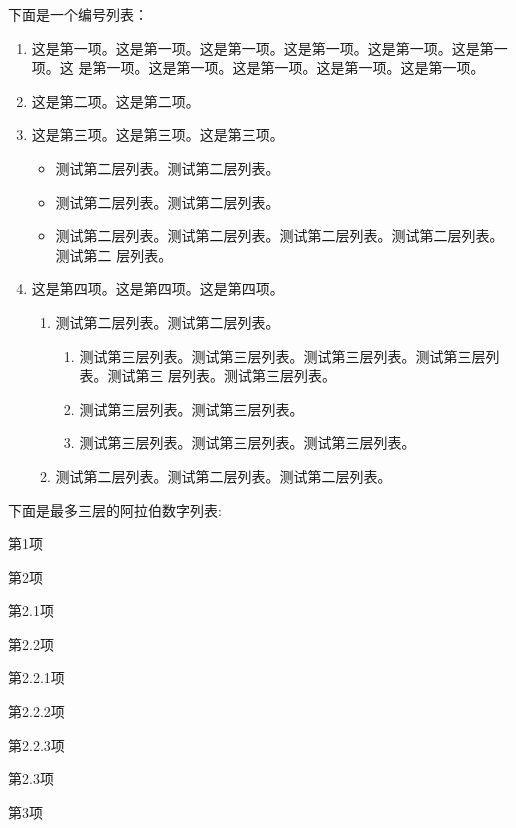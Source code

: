 \documentclass[phd,nobackinfo]{scutthesis}
\begin{document}
下面是一个编号列表：

\begin{enumerate}
\item 这是第一项。这是第一项。这是第一项。这是第一项。这是第一项。这是第一项。这
  是第一项。这是第一项。这是第一项。这是第一项。这是第一项。
\item 这是第二项。这是第二项。
\item 这是第三项。这是第三项。这是第三项。
  \begin{itemize}
  \item 测试第二层列表。测试第二层列表。
  \item 测试第二层列表。测试第二层列表。
  \item 测试第二层列表。测试第二层列表。测试第二层列表。测试第二层列表。测试第二
    层列表。
  \end{itemize}
\item 这是第四项。这是第四项。这是第四项。
  \begin{enumerate}
  \item 测试第二层列表。测试第二层列表。
  \begin{enumerate}
  \item 测试第三层列表。测试第三层列表。测试第三层列表。测试第三层列表。测试第三
    层列表。测试第三层列表。
  \item 测试第三层列表。测试第三层列表。
  \item 测试第三层列表。测试第三层列表。测试第三层列表。
  \end{enumerate}
  \item 测试第二层列表。测试第二层列表。测试第二层列表。
  \end{enumerate}
\end{enumerate}

下面是最多三层的阿拉伯数字列表:
\begin{arabicenum}
\item 第1项
\item 第2项
  \begin{arabicenum}
  \item 第2.1项
  \item 第2.2项
    \begin{arabicenum}
    \item 第2.2.1项
    \item 第2.2.2项
    \item 第2.2.3项
    \end{arabicenum}
  \item 第2.3项
  \end{arabicenum}
\item 第3项
\end{arabicenum}
\end{document}

